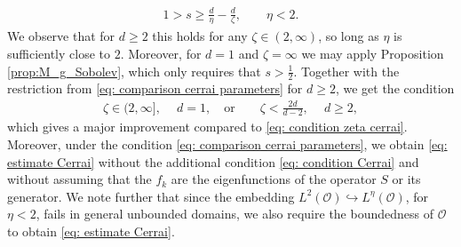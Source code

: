 \documentclass[reqno]{amsart}
\theoremstyle{plain}
\theoremstyle{remark}
\theoremstyle{plain}
\numberwithin{equation}{section}
\newcommand\cO{\mathcal{O}}
\newcommand{\1}{\one}
\begin{document}
\begin{align}
\label{eq: comparison cerrai parameters}
1>s\geq \frac{d}{\eta}-\frac{d}{\zeta},\qquad \eta<2.
\end{align}
We observe that for $d\geq 2$ this holds for any $\zeta\in (2,\infty)$, so long as $\eta$ is sufficiently close to $2$.
Moreover, for $d=1$ and $\zeta=\infty$ we may apply Proposition \ref{prop:M_g_Sobolev}, which only requires that $s>\tfrac{1}{2}$. Together with the restriction from \eqref{eq: comparison cerrai parameters} for $d\geq 2$, we get the condition
\begin{align}
\label{eq: final condition comparison cerrai}
\zeta\in (2,\infty],\ \quad d=1,
\quad\text{or}\qquad
\zeta<\frac{2d}{d-2},\ \quad d\geq 2,
\end{align}
which gives a major improvement compared to \eqref{eq: condition zeta cerrai}. 
 Moreover, under the condition \eqref{eq: comparison cerrai parameters}, we obtain \eqref{eq: estimate Cerrai} without the additional condition \eqref{eq: condition Cerrai} and without assuming that the $f_k$ are the eigenfunctions of the operator $S$ or its generator. We note further that since the embedding $L^2(\cO)\hookrightarrow L^\eta(\cO)$, for $\eta<2$, fails in general unbounded domains, we also require the boundedness of $\cO$ to obtain \eqref{eq: estimate Cerrai}.
\end{document}
